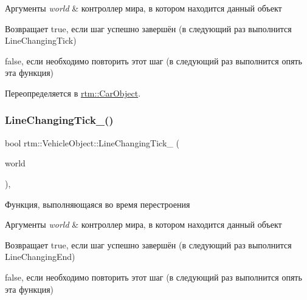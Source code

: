 \begin{DoxyParams}{Аргументы}
{\em world} & контроллер мира, в котором находится данный объект \\
\hline
\end{DoxyParams}
\begin{DoxyReturn}{Возвращает}
true, если шаг успешно завершён (в следующий раз выполнится Line\+Changing\+Tick) 

false, если необходимо повторить этот шаг (в следующий раз выполнится опять эта функция) 
\end{DoxyReturn}


Переопределяется в \hyperlink{classrtm_1_1_car_object_a34063664a03d36d1308c80e064d1ae61}{rtm\+::\+Car\+Object}.

\mbox{\label{classrtm_1_1_vehicle_object_ad14f2e164f2105fbae0c982cec4aff9a}} 
\subsubsection{\texorpdfstring{Line\+Changing\+Tick\+\_\+()}{LineChangingTick\_()}}
{\footnotesize\ttfamily bool rtm\+::\+Vehicle\+Object\+::\+Line\+Changing\+Tick\+\_\+ (\begin{DoxyParamCaption}\item[{\hyperlink{classrtm_1_1_world_controller}{World\+Controller} $\ast$const}]{world }\end{DoxyParamCaption})\hspace{0.3cm}{\ttfamily [protected]}, {\ttfamily [virtual]}}



Функция, выполняющаяся во время перестроения 


\begin{DoxyParams}{Аргументы}
{\em world} & контроллер мира, в котором находится данный объект \\
\hline
\end{DoxyParams}
\begin{DoxyReturn}{Возвращает}
true, если шаг успешно завершён (в следующий раз выполнится Line\+Changing\+End) 

false, если необходимо повторить этот шаг (в следующий раз выполнится опять эта функция) 
\end{DoxyReturn}
\mbox{\label{classrtm_1_1_vehicle_object_a61c3ec3ea6a03c4c031c2b72def10c72}} 
